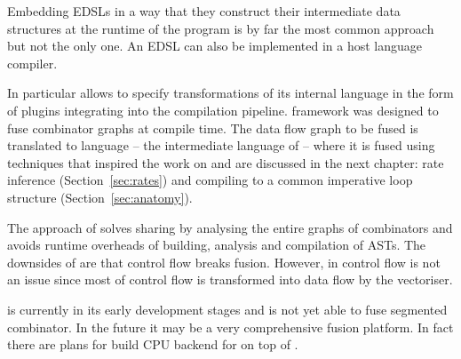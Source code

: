 \documentclass[preamble.tex]{subfiles}
\begin{document}
Embedding EDSLs in a way that they construct their intermediate data structures at the runtime of the program is by far the most common approach but not the only one. An EDSL can also be implemented in a host language compiler.

In particular \GHC allows to specify transformations of its internal  language in the form of plugins integrating into the compilation pipeline. \FlowFusion framework \cite{FlowFusion, FusingFiltersILP} was designed to fuse combinator graphs at compile time. The data flow graph to be fused is translated to  language -- the intermediate language of  \cite{DDC} -- where it is fused using  techniques that inspired the work on \LiveFusion and are discussed in the next chapter: rate inference (Section~\ref{sec:rates}) and compiling to a common imperative loop structure (Section~\ref{sec:anatomy}).

The approach of \FlowFusion solves sharing by analysing the entire graphs of combinators and avoids runtime overheads of building, analysis and compilation of ASTs. The downsides of \FlowFusion are that control flow breaks fusion. However, in \DPH control flow is not an issue since most of control flow is transformed into data flow by the vectoriser.

\FlowFusion is currently in its early development stages and is not yet able to fuse segmented combinator. In the future it may be a very comprehensive fusion platform. In fact there are plans for build CPU backend for \Accelerate on top of \FlowFusion.
\end{document}
